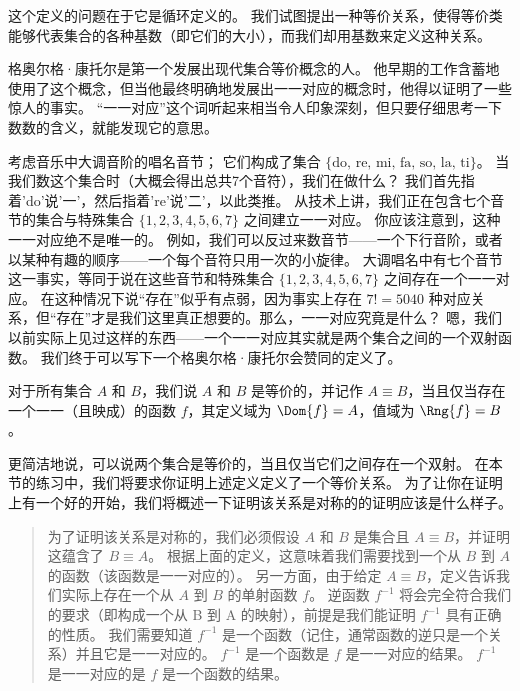 这个定义的问题在于它是循环定义的。
我们试图提出一种等价关系，使得等价类能够代表集合的各种基数（即它们的大小），而我们却用基数来定义这种关系。

格奥尔格·康托尔是第一个发展出现代集合等价概念的人。
他早期的工作含蓄地使用了这个概念，但当他最终明确地发展出一一对应的概念时，他得以证明了一些惊人的事实。
“一一对应”这个词听起来相当令人印象深刻，但只要仔细思考一下数数的含义，就能发现它的意思。

考虑音乐中大调音阶的唱名音节；
它们构成了集合 $\{\mbox{do, re, mi, fa, so, la, ti}\}$。
当我们数这个集合时（大概会得出总共7个音符），我们在做什么？
我们首先指着'do'说'一'，然后指着're'说'二'，以此类推。
从技术上讲，我们正在包含七个音节的集合与特殊集合 $\{1, 2, 3, 4, 5, 6, 7\}$ 之间建立一一对应。
你应该注意到，这种一一对应绝不是唯一的。
例如，我们可以反过来数音节——一个下行音阶，或者以某种有趣的顺序——一个每个音符只用一次的小旋律。
大调唱名中有七个音节这一事实，等同于说在这些音节和特殊集合 $\{1, 2, 3, 4, 5, 6, 7\}$ 之间存在一个一一对应。
在这种情况下说“存在”似乎有点弱，因为事实上存在 $7! = 5040$ 种对应关系，但“存在”才是我们这里真正想要的。那么，一一对应究竟是什么？
嗯，我们以前实际上见过这样的东西——一个一一对应其实就是两个集合之间的一个双射函数。
我们终于可以写下一个格奥尔格·康托尔会赞同的定义了。

\begin{defi}
    对于所有集合 $A$ 和 $B$，我们说 $A$ 和 $B$ 是等价的，并记作 $A \equiv B$，当且仅当存在一个一一（且映成）的函数 $f$，其定义域为 $\Dom{f} = A$，值域为 $\Rng{f} = B$。
\end{defi}

更简洁地说，可以说两个集合是等价的，当且仅当它们之间存在一个双射。
在本节的练习中，我们将要求你证明上述定义定义了一个等价关系。
为了让你在证明上有一个好的开始，我们将概述一下证明该关系是对称的的证明应该是什么样子。

\begin{quote}
    为了证明该关系是对称的，我们必须假设 $A$ 和 $B$ 是集合且 $A \equiv B$，并证明这蕴含了 $B \equiv A$。
    根据上面的定义，这意味着我们需要找到一个从 $B$ 到 $A$ 的函数（该函数是一一对应的）。
    另一方面，由于给定 $A \equiv B$，定义告诉我们实际上存在一个从 $A$ 到 $B$ 的单射函数 $f$。
    逆函数 $f^{-1}$ 将会完全符合我们的要求（即构成一个从 B 到 A 的映射），前提是我们能证明 $f^{-1}$ 具有正确的性质。
    我们需要知道 $f^{-1}$ 是一个函数（记住，通常函数的逆只是一个关系）并且它是一一对应的。
    $f^{-1}$ 是一个函数是 $f$ 是一一对应的结果。
    $f^{-1}$ 是一一对应的是 $f$ 是一个函数的结果。

\end{quote}

